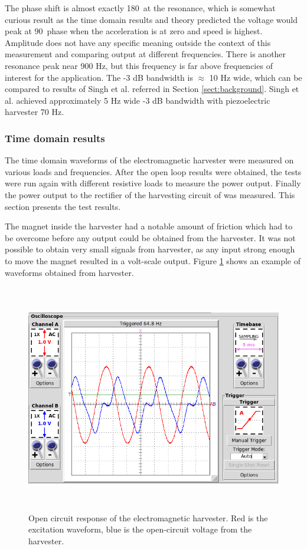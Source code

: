 The phase shift is almost exactly 180\degree \ at the resonance, which is somewhat curious result as the time domain results and theory predicted the voltage would peak at 90\degree \ phase when the acceleration is at zero and speed is highest. Amplitude does not have any specific meaning outside the context of this measurement and comparing output at different frequencies.  There is another resonance peak near 900 Hz, but this frequency is far above frequencies of interest for the application. The -3 dB bandwidth is $ \approx $ 10 Hz wide, which can be compared to results of Singh et al. \cite{Singh2012} referred in Section \ref{sect:background}. Singh et al. achieved approximately 5 Hz wide -3 dB bandwidth with piezoelectric harvester 70 Hz.


\subsubsection{Time domain results}\label{sect:lg_td}
The time domain waveforms of the electromagnetic harvester were measured on various loads and frequencies. After the open loop results were obtained, the tests were run again with different resistive loads to measure the power output. Finally the power output to the rectifier of the harvesting circuit of was measured. This section presents the test results. 

The magnet inside the harvester had a notable amount of friction which had to be overcome before any output could be obtained from the harvester. It was not possible to obtain very small signals from harvester, as any input strong enough to move the magnet resulted in a volt-scale output. Figure \ref{fig:inductive_65_open_dry} shows an example of waveforms obtained from harvester. 

\begin{figure}[htb]
\begin{center}
\includegraphics[height=10cm]{images/own_measurement/generator_shaker/inductive_td_open_65hz_dry.png}
\end{center}
\caption{\label{fig:inductive_65_open_dry} Open circuit response of the electromagnetic harvester. Red is the excitation waveform, blue is the open-circuit voltage from the harvester.}
\end{figure}

